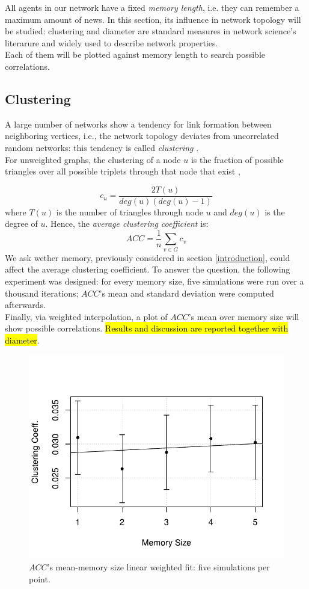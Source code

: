 All agents in our network have a fixed \textit{memory length}, i.e. they can remember a maximum
 amount of news.
In this section, its influence in network topology will be studied: clustering and
 diameter are standard measures in network science's literarure and widely used to describe 
 network properties.\\
  Each of them will be plotted 
 against memory length to search possible correlations.
\subsection{Clustering} \label{clustering}
A large number of networks show a tendency for link formation between neighboring vertices, 
i.e., the network topology deviates from uncorrelated random networks: this tendency is called 
\textit{clustering} \cite{clusterarticle}. \\
For unweighted graphs, the clustering of a node $u$ is the fraction of possible triangles over 
all possible triplets  through that node that exist \cite{clustersite},

\begin{equation}
\label{eq:clustering}
c_u = \frac{2 T(u)}{deg(u)(deg(u)-1)}
\end{equation}
where $T(u)$ is the number of triangles through node $u$ and $deg(u)$ is the degree of $u$.
Hence, the \textit{average clustering coefficient}  is:
\begin{equation}
\label{eq:average_clustering}
ACC = \frac{1}{n}\sum_{v \in G} c_v
\end{equation}
We ask wether memory, previously considered in section \ref{introduction}, could affect the 
average clustering coefficient.
To answer the question, the following experiment was designed:
for every memory size, five simulations were run over a thousand iterations; $ACC$'s mean and 
standard deviation were computed afterwards.\\
Finally, via weighted interpolation, a plot of $ACC$'s mean over memory size will show possible
 correlations. \hl{Results and discussion are reported together with diameter}.
\begin{figure}[h]
  \centering
  \includegraphics[trim={0cm 0cm 0cm 1cm},clip,width=.8\columnwidth]{img/clustering.pdf}
  \caption{$ACC$'s mean-memory size linear weighted fit: five simulations per point.}
  \label{fig:clustering}
\end{figure}

